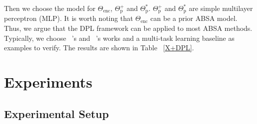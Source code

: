 \documentclass[11pt]{article}
\begin{document}
Then we choose the model for $\Theta_{\text{enc}}$, $\Theta^+_{\text{p}}$ and $\Theta^*_{\text{p}}$.
$\Theta^+_{\text{p}}$ and $\Theta^*_{\text{p}}$ are simple multilayer perceptron (MLP).
It is worth noting that $\Theta_{\text{enc}}$ can be a prior ABSA model.
Thus, we argue that the DPL framework can be applied to most ABSA methods.
Typically, we choose ~\citet{bai2020investigating}'s and ~\citet{rietzler2019adapt}'s works and a multi-task learning baseline as examples to verify. The results are shown in Table ~\ref{X+DPL}.





































\begin{table}
\centering
{}
\caption{\label{Statistics-dataset} Statistics of SemEval 2014 task 4 subtask 2.}
\end{table}


\section{Experiments}




\subsection{Experimental Setup}
\end{document}
